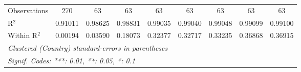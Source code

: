 \begin{table}[htbp]
\begin{tabular}{lcccccccc}
      Observations                                                           & 270      & 63       & 63             & 63              & 63              & 63              & 63                    & 63\\  
      R$^2$                                                                  & 0.91011  & 0.98625  & 0.98831        & 0.99035         & 0.99040         & 0.99048         & 0.99099               & 0.99100\\  
      Within R$^2$                                                           & 0.00194  & 0.03590  & 0.18073        & 0.32377         & 0.32717         & 0.33235         & 0.36868               & 0.36915\\  
      \midrule \midrule
      \multicolumn{9}{l}{\emph{Clustered (Country) standard-errors in parentheses}}\\
      \multicolumn{9}{l}{\emph{Signif. Codes: ***: 0.01, **: 0.05, *: 0.1}}\\
   \end{tabular}
\end{table}


